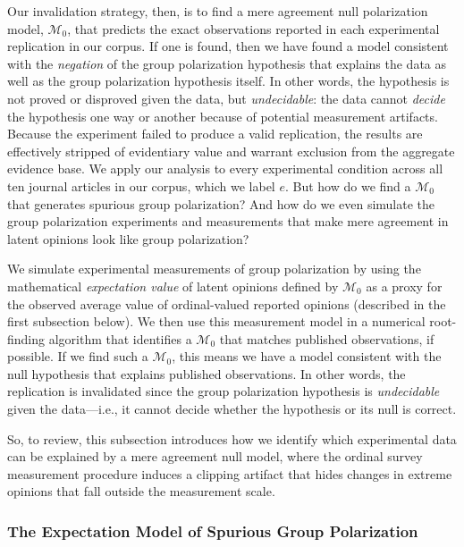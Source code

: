 \documentclass[preview]{article}
\newcommand{\nullmodel}{\mathcal{M}_0}
\begin{document}
Our invalidation strategy, then, is to find a mere agreement null
polarization model, $\nullmodel$, that predicts the exact observations
reported in each experimental replication in our corpus. If one is
found, then we have found a model consistent with the \emph{negation} of
the group polarization hypothesis that explains the data as well as the
group polarization hypothesis itself. In other words, the hypothesis is
not proved or disproved given the data, but \emph{undecidable}: the data
cannot \emph{decide} the hypothesis one way or another because of
potential measurement artifacts. Because the experiment failed to
produce a valid replication, the results are effectively stripped of
evidentiary value and warrant exclusion from the aggregate evidence
base. We apply our analysis to every experimental condition across all
ten journal articles in our corpus, which we label $e$. But how do we find a $\nullmodel$ that generates spurious group polarization?
And how do we even simulate the group polarization experiments and
measurements that make mere agreement in latent opinions look like group
polarization? 

We simulate experimental measurements of group
polarization by using the mathematical \emph{expectation value} of
latent opinions defined by $\nullmodel$ as a proxy for the observed average
value of ordinal-valued reported opinions (described in the first
subsection below). We then use this measurement model in a numerical
root-finding algorithm that identifies a $\nullmodel$ that matches published
observations, if possible. If we find such a $\nullmodel$, this means we have
a model consistent with the null hypothesis that explains published
observations. In other words, the replication is invalidated since the
group polarization hypothesis is \emph{undecidable} given the
data---i.e., it cannot decide whether the hypothesis or its null is
correct.

So, to review, this subsection introduces how we identify which
experimental data can be explained by a mere agreement null model, where
the ordinal survey measurement procedure induces a clipping artifact
that hides changes in extreme opinions that fall outside the measurement
scale.


\subsubsection{The Expectation Model of Spurious Group
Polarization}\label{the-expectation-model-of-spurious-group-polarization}
\end{document}
